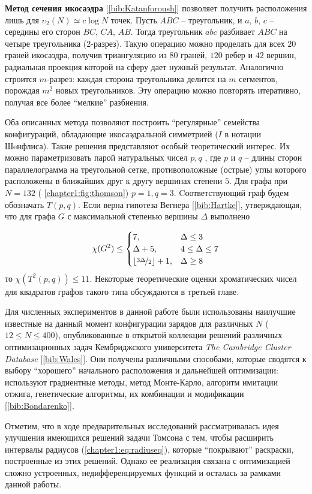 \textbf{Метод сечения икосаэдра} [\ref{bib:Katanforoush}] позволяет получить расположения лишь 
для $\upsilon_2(N) \simeq c\log{}N$ точек. 
Пусть $ABC$ -- треугольник, и $a,\,b,\,c$ -- середины его сторон $BC,\,CA,\,AB$. 
Тогда треугольник $abc$ разбивает $ABC$ на четыре треугольника (2-разрез). 
Такую операцию можно проделать для всех $20$ граней икосаэдра, 
получив триангуляцию из $80$ граней, $120$ ребер и $42$ вершин, радиальная проекция которой на сферу дает нужный результат. 
Аналогично строится $m$-разрез: каждая сторона треугольника делится на $m$ сегментов, порождая $m^2$ новых треугольников.
Эту операцию можно повторять итеративно, получая все более \enquote{мелкие} разбиения. 

Оба описанных метода позволяют построить \enquote{регулярные} семейства конфигураций, 
обладающие икосаэдральной симметрией ($I$ в нотации Шeнфлиса).
Такие решения представляют особый теоретический интерес.
Их можно параметризовать парой натуральных чисел $p,q$ , где $p$ и $q$ -- длины сторон параллелограмма на треугольной сетке, 
противоположные (острые) углы которого расположены в ближайших друг к другу вершинах степени $5$. 
Для графа при $N=132$ (\figurename{ \ref{chapter1:fig:thomson}}) $p=1,q=3$.
Cоответствующий граф будем обозначать $T(p,q)$. 
Если верна гипотеза Вегнера [\ref{bib:Hartke}], утверждающая, что для графа $G$ 
с максимальной степенью вершины $\Delta$ выполнено

\begin{equation}\label{chapter1:eq:wegner}
\chi(G^2) \le 
\begin{cases}
7, & \Delta \le 3 \\
\Delta + 5, & 4 \le \Delta \le 7 \\
\lfloor \nicefrac{3\Delta}{2} \rfloor + 1, & \Delta \ge 8
\end{cases}
\end{equation}
то $\chi(T^2(p,q)) \le 11$.
Некоторые теоретические оценки хроматических чисел для квадратов графов такого типа обсуждаются в третьей главе.

Для численных экспериментов в данной работе были использованы наилучшие 
известные на данный момент конфигурации зарядов для различных $N$ ($12 \le N \le 400$), опубликованные 
в открытой коллекции решений различных оптимизационных задач Кембриджского университета
\textit{The Cambridge Cluster Database} [\ref{bib:Wales}]. 
Они получены различными способами, которые сводятся к выбору \enquote{хорошего} начального расположения
и дальнейшей оптимизации: 
используют градиентные методы, метод Монте-Карло, алгоритм имитации отжига, 
генетические алгоритмы, их комбинации и модификации [\ref{bib:Bondarenko}].

Отметим, что в ходе предварительных исследований рассматривалась идея улучшения имеющихся решений задачи Томсона
с тем, чтобы расширить интервалы радиусов (\ref{chapter1:eq:radiuseq}), которые \enquote{покрывают} раскраски, 
построенные из этих решений. Однако ее реализация связана с оптимизацией сложно устроенных, 
недифференцируемых функций и осталась за рамками данной работы.
